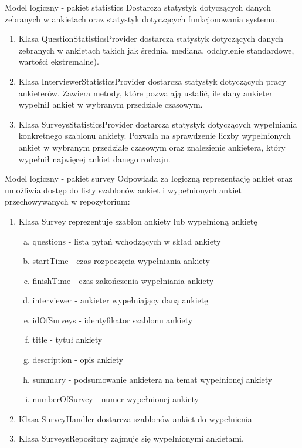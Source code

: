 \documentclass[a4paper,10pt]{beamer}
\begin{document}
		\begin{frame}{Model logiczny - pakiet statistics}
			Dostarcza statystyk dotyczących danych zebranych w ankietach oraz statystyk dotyczących funkcjonowania systemu.
		\begin{enumerate}[1)]
			\item Klasa QuestionStatisticsProvider dostarcza statystyk dotyczących danych zebranych w ankietach takich jak średnia, mediana, odchylenie standardowe, wartości ekstremalne).
			\item Klasa InterviewerStatisticsProvider dostarcza statystyk dotyczących pracy ankieterów. Zawiera metody, które pozwalają ustalić, ile dany ankieter wypełnił ankiet w wybranym przedziale czasowym.
			\item Klasa SurveysStatisticsProvider dostarcza statystyk dotyczących wypełniania konkretnego szablonu ankiety. Pozwala na sprawdzenie liczby wypełnionych ankiet w wybranym przedziale czasowym oraz znalezienie ankietera, który wypełnił najwięcej ankiet danego rodzaju.
		\end{enumerate}
	\end{frame}
	\begin{frame}{Model logiczny - pakiet survey}
	Odpowiada za logiczną reprezentację ankiet oraz umożliwia dostęp do listy szablonów ankiet i wypełnionych ankiet przechowywanych w repozytorium:
	\begin{enumerate}[1)]
			\item Klasa Survey reprezentuje szablon ankiety lub wypełnioną ankietę
			\begin{enumerate}[a)]
					\item questions - lista pytań wchodzących w skład ankiety
					\item startTime - czas rozpoczęcia wypełniania ankiety
					\item finishTime - czas zakończenia wypełniania ankiety
					\item interviewer - ankieter wypełniający daną ankietę
					\item idOfSurveys - identyfikator szablonu ankiety
					\item title - tytuł ankiety
					\item description - opis ankiety
					\item summary - podsumowanie ankietera na temat wypełnionej ankiety
					\item numberOfSurvey - numer wypełnionej ankiety
			\end{enumerate}
			\item Klasa SurveyHandler dostarcza szablonów ankiet do wypełnienia
			\item Klasa SurveysRepository zajmuje się wypełnionymi ankietami.
	\end{enumerate}
\end{frame}
	
\end{document}
